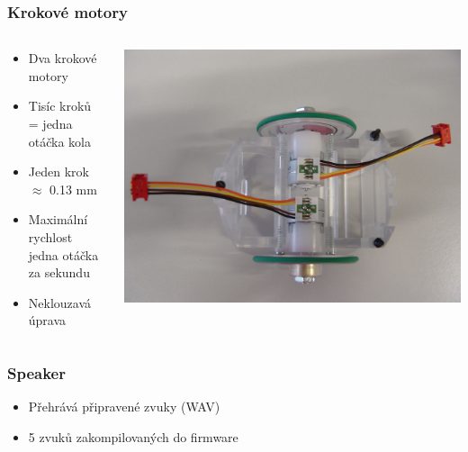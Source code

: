 \documentclass{beamer}
\begin{document}
\begin{frame}
    \frametitle{Krokové motory}
    \begin{columns}
        \begin{column}{0.5\textwidth}
            \begin{itemize}
                \item Dva krokové motory
                \item Tisíc kroků = jedna otáčka kola
                \item Jeden krok $\approx$ 0.13 mm
                \item Maximální rychlost jedna otáčka za sekundu
                \item Neklouzavá úprava
            \end{itemize}
        \end{column}

        \begin{column}{0.5\textwidth}
            \includegraphics[scale=0.15]{mecanics.jpg}
        \end{column}
    \end{columns}
\end{frame}

\begin{frame}
    \frametitle{Speaker}
        \begin{itemize}
            \item Přehrává připravené zvuky (WAV)
            \item 5 zvuků zakompilovaných do firmware
        \end{itemize}
\end{frame}
\end{document}
